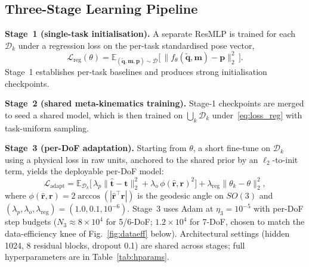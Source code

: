 \documentclass[conference]{IEEEtran}
\begin{document}
\subsection{Three-Stage Learning Pipeline}

\textbf{Stage~1 (single-task initialisation).} A separate ResMLP is trained for each $\mathcal{D}_k$ under a regression loss on the per-task standardised pose vector,
\begin{equation}
\mathcal{L}_{\mathrm{reg}}(\theta) = \mathbb{E}_{(\tilde{\mathbf{q}},\mathbf{m},\mathbf{p})\sim\mathcal{D}}\bigl[\,\lVert f_\theta(\tilde{\mathbf{q}},\mathbf{m})-\mathbf{p}\rVert_2^2\,\bigr].
\label{eq:loss_reg}
\end{equation}
Stage~1 establishes per-task baselines and produces strong initialisation checkpoints.

\textbf{Stage~2 (shared meta-kinematics training).} Stage-1 checkpoints are merged to seed a shared model, which is then trained on $\bigcup_k\mathcal{D}_k$ under~\eqref{eq:loss_reg} with task-uniform sampling.

\textbf{Stage~3 (per-DoF adaptation).} Starting from $\theta$, a short fine-tune on $\mathcal{D}_k$ using a physical loss in raw units, anchored to the shared prior by an $\ell_2$-to-init term, yields the deployable per-DoF model:
\begin{equation}
\!\!\mathcal{L}_{\mathrm{adapt}}\!=\!\mathbb{E}_{\mathcal{D}_k}\!\bigl[\,\lambda_p\lVert\hat{\mathbf{t}}-\mathbf{t}\rVert_2^2\!+\!\lambda_o\,\phi(\hat{\mathbf{r}},\mathbf{r})^2\bigr]\!+\!\lambda_{\mathrm{reg}}\lVert\theta_k\!-\!\theta\rVert_2^2,
\label{eq:loss_adapt}
\end{equation}
where $\phi(\hat{\mathbf{r}},\mathbf{r})\!=\!2\arccos(|\hat{\mathbf{r}}^\top\mathbf{r}|)$ is the geodesic angle on $SO(3)$ and $(\lambda_p,\lambda_o,\lambda_{\mathrm{reg}})\!=\!(1.0,0.1,10^{-6})$. Stage~3 uses Adam at $\eta_3\!=\!10^{-5}$ with per-DoF step budgets ($N_3\!\approx\!8\!\times\!10^4$ for 5/6-DoF; $1.2\!\times\!10^4$ for 7-DoF, chosen to match the data-efficiency knee of Fig.~\ref{fig:dataeff} below). Architectural settings (hidden 1024, 8 residual blocks, dropout 0.1) are shared across stages; full hyperparameters are in Table~\ref{tab:hparams}.
\end{document}
